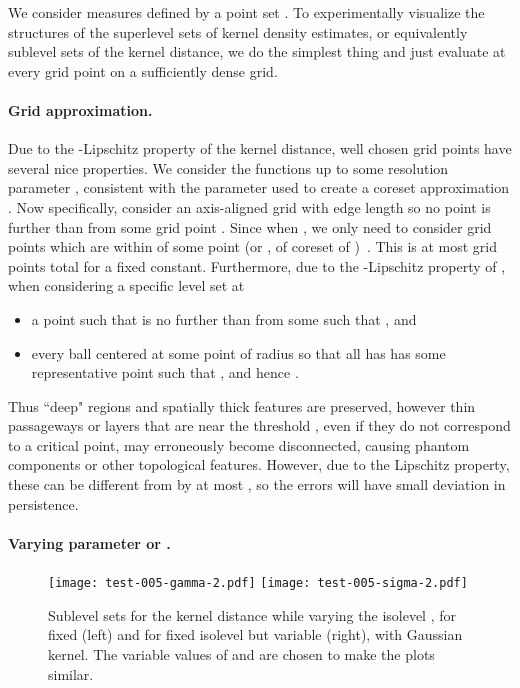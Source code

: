 \documentclass[11pt]{myclass}
\begin{document}
We consider measures  defined by a point set .  
To experimentally visualize the structures of the superlevel sets of kernel density estimates, or equivalently sublevel sets of the kernel distance, we do the simplest thing and just evaluate  at every grid point on a sufficiently dense grid.  


\paragraph{Grid approximation.}
Due to the -Lipschitz property of the kernel distance, well chosen grid points have several nice properties.  
We consider the functions up to some resolution parameter , consistent with the parameter used to create a coreset approximation .  
Now specifically, consider an axis-aligned grid  with edge length  so no point  is further than  from some grid point .  
Since  when , we only need to consider grid points  which are within  of some point  (or , of coreset  of )~\cite{JoshiKommarajuPhillips2011,big-kde}.  This is at most  grid points total for  a fixed constant.  
Furthermore, due to the -Lipschitz property of , when considering a specific level set at 
\begin{itemize}
\item a point  such that  is no further than  from some  such that , and 
\item every ball  centered at some point  of radius  so that all  has  has some representative point  such that , and hence . 
\end{itemize} 
Thus ``deep" regions and spatially thick features are preserved, however thin passageways or layers that are near the threshold , even if they do not correspond to a critical point, may erroneously become disconnected, causing phantom components or other topological features.  However, due to the Lipschitz property, these can be different from  by at most , so the errors will have small deviation in persistence.



\paragraph{Varying parameter  or .}
\label{sec:exp}

\begin{figure}
\begin{center}
\texttt{[image: test-005-gamma-2.pdf]}
\hspace{10mm}
\texttt{[image: test-005-sigma-2.pdf]}
\end{center}

\caption{\label{fig:gamma-v-sigma} \small \sffamily
Sublevel sets for the kernel distance while varying the isolevel , for fixed  (left) and for fixed isolevel  but variable  (right), with Gaussian kernel.  The variable values of  and  are chosen to make the plots similar.}  
\end{figure}
\end{document}
